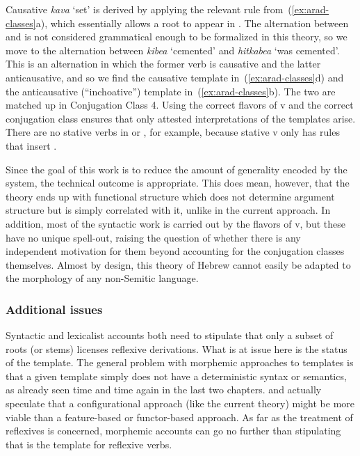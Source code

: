 Causative \emph{kava} `set' is derived by applying the relevant rule from~(\ref{ex:arad-classes}a), which essentially allows a root to appear in {\tkal}. The alternation between {\tkal} and {\tpie} is not considered grammatical enough to be formalized in this theory, so we move to the alternation between \emph{kibea} `cemented' and \emph{hitkabea} `was cemented'. This is an alternation in which the former verb is causative and the latter anticausative, and so we find the causative template in~(\ref{ex:arad-classes}d) and the anticausative (``inchoative'') template in~(\ref{ex:arad-classes}b). The two are matched up in Conjugation Class 4. Using the correct flavors of v and the correct conjugation class ensures that only attested interpretations of the templates arise. There are no stative verbs in {\tpie} or {\thit}, for example, because stative v only has rules that insert {\tkal}. 

Since the goal of this work is to reduce the amount of generality encoded by the system, the technical outcome is appropriate. This does mean, however, that the theory ends up with functional structure which does not determine argument structure but is simply correlated with it, unlike in the current approach. In addition, most of the syntactic work is carried out by the flavors of v, but these have no unique spell-out, raising the question of whether there is any independent motivation for them beyond accounting for the conjugation classes themselves. Almost by design, this theory of Hebrew cannot easily be adapted to the morphology of any non-Semitic language.

		\subsubsection{Additional issues}
Syntactic and lexicalist accounts both need to stipulate that only a subset of roots (or stems) licenses reflexive derivations. What is at issue here is the status of the template. The general problem with morphemic approaches to templates is that a given template simply does not have a deterministic syntax or semantics, as already seen time and time again in the last two chapters. \citet[197]{arad05} and \citet[564]{borer13oup} actually speculate that a configurational approach (like the current theory) might be more viable than a feature-based or functor-based approach. As far as the treatment of reflexives is concerned, morphemic accounts can go no further than stipulating that {\thit} is the template for reflexive verbs.

